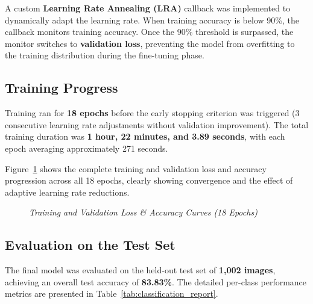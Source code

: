 A custom \textbf{Learning Rate Annealing (LRA)} callback was implemented to
dynamically adapt the learning rate. When training accuracy is below 90\%, the
callback monitors training accuracy. Once the 90\% threshold is surpassed, the
monitor switches to \textbf{validation loss}, preventing the model from
overfitting to the training distribution during the fine-tuning phase.

\subsection{Training Progress}
Training ran for \textbf{18 epochs} before the early stopping criterion was
triggered (3 consecutive learning rate adjustments without validation improvement).
The total training duration was \textbf{1 hour, 22 minutes, and 3.89 seconds},
with each epoch averaging approximately 271 seconds.



Figure~\ref{fig:sprint2_training_curves} shows the complete training and validation
loss and accuracy progression across all 18 epochs, clearly showing convergence and
the effect of adaptive learning rate reductions.

\begin{figure}[H]
	\centering
	\caption{\textit{Training and Validation Loss \& Accuracy Curves (18 Epochs)}}
	\label{fig:sprint2_training_curves}
\end{figure}

\subsection{Evaluation on the Test Set}
The final model was evaluated on the held-out test set of \textbf{1,002 images},
achieving an overall test accuracy of \textbf{83.83\%}. The detailed per-class
performance metrics are presented in Table~\ref{tab:classification_report}.

